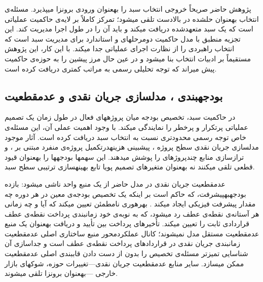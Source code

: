 پژوهش حاضر صریحاً خروجی انتخاب سبد را به\zwnj{}عنوان ورودی برون\zwnj{}زا می\zwnj{}پذیرد.
مسئله‌ی انتخاب به\zwnj{}عنوان حل\zwnj{}شده در بالادست تلقی می\zwnj{}شود؛
تمرکز کاملاً بر لایه‌ی حاکمیت عملیاتی است که
یک سبد متعهدشده دریافت می\zwnj{}کند و باید آن را در طول اجرا مدیریت کند.
این تجزیه منطبق با مدل حاکمیت دومرحله\zwnj{}ای \citet{Turner2014}
و استاندارد  برای مدیریت سبد \citep{PMI2017} است
که انتخاب راهبردی را از نظارت اجرای عملیاتی جدا می\zwnj{}کند.
با این کار، این پژوهش مستقیماً بر ادبیات انتخاب بنا می\zwnj{}شود
و در عین حال مرز پیشین را به حوزه‌ی حاکمیت پیش می\zwnj{}راند
که توجه تحلیلی رسمی به مراتب کمتری دریافت کرده است.

\subsection{بودجه\zwnj{}بندی ، مدل\zwnj{}سازی جریان نقدی و عدم\zwnj{}قطعیت}
\label{subsec:lr_cashflow}

در حاکمیت سبد، تخصیص بودجه میان پروژه\zwnj{}های فعال در طول زمان
یک تصمیم عملیاتی پرتکرار و پرخطر را نمایندگی می\zwnj{}کند.
با وجود اهمیت عملی آن، این مسئله‌ی خاص
توجه رسمی محدودتری نسبت به انتخاب سبد دریافت کرده است.
آثار موجود مدل\zwnj{}سازی جریان نقدی سطح پروژه
\citep{Kenley2009, Park2004}،
پیش\zwnj{}بینی هزینه\zwnj{}در\zwnj{}تکمیل پروژه‌ی منفرد مبتنی بر 
\citep{Kim2002, Acebes2015}،
و تراز\zwnj{}سازی منابع چندپروژه\zwnj{}ای \citep{Lova2000, Peteghem2010}
را پوشش می\zwnj{}دهند.
این سهم\zwnj{}ها بودجه\zwnj{}ها را به\zwnj{}عنوان قیود قطعی تلقی می\zwnj{}کنند
نه به\zwnj{}عنوان متغیرهای تصمیم پویا تابع
بهینه\zwnj{}سازی ترتیبی سطح سبد.

عدم\zwnj{}قطعیت جریان نقدی در مدل حاضر از یک منبع واحد ناشی می\zwnj{}شود:
بازده بودجه\zwnj{}به\zwnj{}پیشرفت، که حاکم است بر اینکه
یک تخصیص بودجه‌ی معین در هر دوره چه مقدار
پیشرفت فیزیکی ایجاد می\zwnj{}کند \citep{Acebes2015, Batselier2017}.
بهره\zwnj{}وری نامطمئن تعیین می\zwnj{}کند که آیا و چه زمانی هر آستانه‌ی نقطه‌ی عطف
رد می\zwnj{}شود، که به نوبه‌ی خود زمان\zwnj{}بندی پرداخت نقطه‌ی عطف قراردادی ثابت
را تعیین می\zwnj{}کند.
تأخیرهای پرداخت بین تأیید و دریافت به\zwnj{}عنوان یک منبع عدم\zwnj{}قطعیت مستقل
مدل نمی\zwnj{}شوند؛ کانال عملکردمحور منبع ساختاری اصلی عدم\zwnj{}قطعیت زمان\zwnj{}بندی
جریان نقدی در قراردادهای پرداخت نقطه‌ی عطف است
و جداسازی آن شناسایی تمیزتر مسئله‌ی تخصیص را
بدون از دست دادن قاب\zwnj{}بندی اصلی عدم\zwnj{}قطعیت ممکن می\zwnj{}سازد.
سایر منابع عدم\zwnj{}قطعیت جریان نقدی---تغییرات حوزه،
شوک\zwnj{}های بازار خارجی \citep{Doloi2012}---به\zwnj{}عنوان برون\zwnj{}زا تلقی می\zwnj{}شوند.

